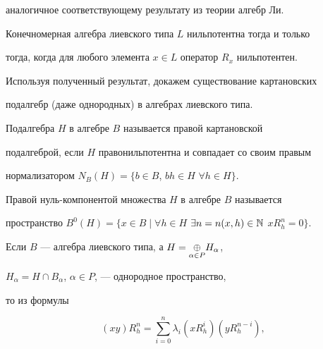 аналогичное соответствующему результату из теории алгебр Ли. 


 


\begin{thm} 


Конечномерная алгебра лиевского типа $L$ нильпотентна тогда и только 


тогда, когда для любого элемента $x\in L$ оператор $R_x$ нильпотентен. 


\end{thm} 


 


Используя полученный результат, докажем существование картановских 


подалгебр (даже однородных) в алгебрах лиевского типа. 


 


\begin{defn} 


Подалгебра $H$ в алгебре $B$ называется правой картановской 


подалгеброй, если $H$ правонильпотентна и совпадает со своим правым 


нормализатором $N_B(H)=\{b\in B$, $b h\in H$ $\forall h\in H\}$. 


\end{defn} 


 


\begin{defn} 


Правой нуль-компонентой множества $H$ в алгебре $B$ называется 


пространство $B^0(H)=\{x\in B\mid\forall h\in H$ $\exists n=n(x,h)\in\Bbb 


N$ $x R^n_h=0\}$. 


\end{defn} 


 


Если $B$ --- алгебра лиевского типа, а $H=\underset{\alpha\in P}{\oplus}{} H_\alpha$, 


$H_\alpha=H\cap B_\alpha$, $\alpha\in P$, --- однородное пространство, 


то из формулы 


\begin{equation} 


(x y)R^n_h=\sum^n_{i=0}\lambda_i(x R^i_h)(y R^{n-i}_h), 


\end{equation} 


